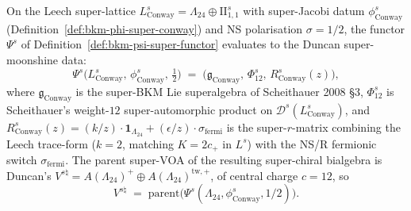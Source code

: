 \begin{theorem}[\texorpdfstring{$V^{s\natural}\;=\;\Psi^{s}(\Lambda_{24},
\phi^{s}_{\mathrm{Conway}},1/2)$}{V-snatural=Psi-s(Lambda-24, phi-s-Conway,1/2)}]
\label{thm:bkm-vs-natural-equals-psi-super}
On the Leech super-lattice
$L^{s}_{\mathrm{Conway}} = \Lambda_{24}\oplus\mathrm{II}_{1,1}^{s}$
with super-Jacobi datum
$\phi^{s}_{\mathrm{Conway}}$ (Definition~\ref{def:bkm-phi-super-conway})
and NS polarisation $\sigma = 1/2$, the functor
$\Psi^{s}$ of Definition~\ref{def:bkm-psi-super-functor} evaluates
to the Duncan super-moonshine data:
\[
 \Psi^{s}\bigl(L^{s}_{\mathrm{Conway}},\,\phi^{s}_{\mathrm{Conway}},\,
 \tfrac{1}{2}\bigr)
 \;=\;\bigl(\mathfrak g_{\mathrm{Conway}},\,\Phi^{s}_{12},\,
 R^{s}_{\mathrm{Conway}}(z)\bigr),
\]
where $\mathfrak g_{\mathrm{Conway}}$ is the super-BKM Lie
superalgebra of Scheithauer 2008 \S3, $\Phi^{s}_{12}$ is Scheithauer's
weight-$12$ super-automorphic product on
$\mathcal D^{s}(L^{s}_{\mathrm{Conway}})$, and
$R^{s}_{\mathrm{Conway}}(z) = (k/z)\cdot
\mathbf 1_{\Lambda_{24}} + (\epsilon/z)\cdot\sigma_{\mathrm{fermi}}$
is the super-$r$-matrix combining the Leech trace-form ($k = 2$,
matching $K = 2c_{+}$ in $L^{s}$) with the NS/R fermionic
switch $\sigma_{\mathrm{fermi}}$. The parent super-VOA of the
resulting super-chiral bialgebra is Duncan's
$V^{s\natural} = A(\Lambda_{24})^{+}\oplus A(\Lambda_{24})^{\mathrm{tw},+}$,
of central charge $c = 12$, so
\[
 V^{s\natural}\;=\;\mathrm{parent}\bigl(\Psi^{s}(
 \Lambda_{24},\phi^{s}_{\mathrm{Conway}},1/2)\bigr).
\]
\end{theorem}

